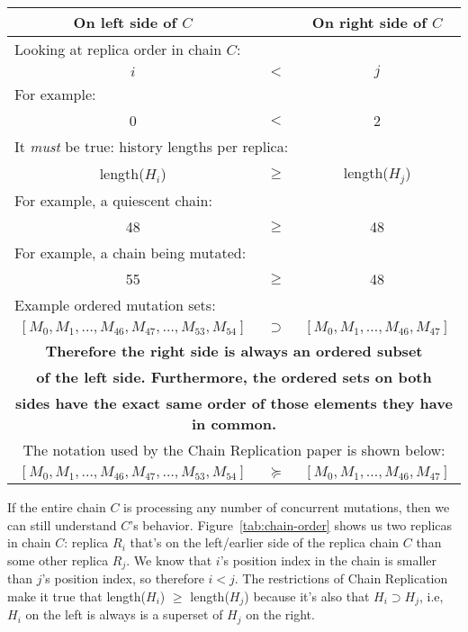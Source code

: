 \documentclass[preprint,10pt]{sigplanconf}
\begin{document}
\begin{figure*}
\centering
\begin{tabular}{ccc}
{\bf {{On left side of $C$}}} & & {\bf On right side of $C$} \\
\hline
\multicolumn{3}{l}{Looking at replica order in chain $C$:} \\
$i$ & $<$ & $j$ \\

\multicolumn{3}{l}{For example:} \\

0 & $<$ & 2 \\
\hline
\multicolumn{3}{l}{It {\em must} be true: history lengths per replica:} \\
length($H_i$) & $\geq$ & length($H_j$) \\
\multicolumn{3}{l}{For example, a quiescent chain:} \\
48 & $\geq$ & 48 \\
\multicolumn{3}{l}{For example, a chain being mutated:} \\
55 & $\geq$ & 48 \\
\multicolumn{3}{l}{Example ordered mutation sets:} \\
$[M_0,M_1,\ldots,M_{46},M_{47},\ldots,M_{53},M_{54}]$ & $\supset$ & $[M_0,M_1,\ldots,M_{46},M_{47}]$ \\
\multicolumn{3}{c}{\bf Therefore the right side is always an ordered
  subset} \\
\multicolumn{3}{c}{\bf of the left side.  Furthermore, the ordered
  sets on both} \\
\multicolumn{3}{c}{\bf sides have the exact same order of those elements they have in common.} \\
\multicolumn{3}{c}{The notation used by the Chain Replication paper is
shown below:} \\
$[M_0,M_1,\ldots,M_{46},M_{47},\ldots,M_{53},M_{54}]$ & $\succeq$ & $[M_0,M_1,\ldots,M_{46},M_{47}]$ \\

\end{tabular}
\caption{A demonstration of Chain Replication protocol history ``Update Propagation Invariant''.}
\label{tab:chain-order}
\end{figure*}

If the entire chain $C$ is processing any number of concurrent
mutations, then we can still understand $C$'s behavior.
Figure~\ref{tab:chain-order} shows us two replicas in chain $C$:
replica $R_i$ that's on the left/earlier side of the replica chain $C$
than some other replica $R_j$.  We know that $i$'s position index in
the chain is smaller than $j$'s position index, so therefore $i < j$.
The restrictions of Chain Replication make it true that length($H_i$)
$\ge$ length($H_j$) because it's also that $H_i \supset H_j$, i.e,
$H_i$ on the left is always is a superset of $H_j$ on the right.
\end{document}
